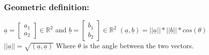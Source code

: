 \subsubsection{Geometric definition:}
$\underline{a} = \begin{bmatrix} a_1 \\ a_2 \end{bmatrix} \in \mathbb{R}^2$ and $\underline{b} = \begin{bmatrix} b_1 \\ b_2 \end{bmatrix} \in \mathbb{R}^2 $
\newline
$(\underline{a}, \underline{b}) = ||\underline{a}|| * ||\underline{b}|| * cos(\theta)$
\newline
$||\underline{a}|| = \sqrt{(\underline{a}, \underline{a})}$
\newline
Where $\theta$ is the angle between the two vectors.

\newpage
